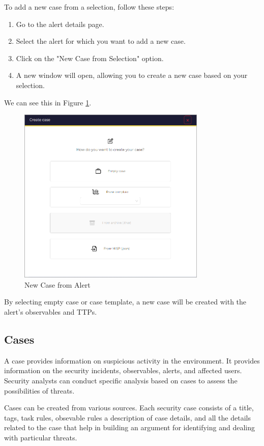 \documentclass{article}
\begin{document}
To add a new case from a selection, follow these steps:

\begin{enumerate}
  \item Go to the alert details page.
  \item Select the alert for which you want to add a new case.
  \item Click on the "New Case from Selection" option.
  \item A new window will open, allowing you to create a new case based on your selection.
\end{enumerate}

We can see this in Figure \ref{fig:newcase}.
\begin{figure}[H]
    \centering
    \includegraphics[width=0.8\textwidth]{alerts2.png}
    \caption{New Case from Alert}
    \label{fig:newcase}
\end{figure}

By selecting empty case  or case template, a new case will be created with the alert's observables and TTPs.\\



\subsection{Cases}

\begin{compactitem}
    \item A case provides information on suspicious activity in the environment. It provides information on the security incidents, observables, alerts, and affected users. Security analysts can conduct specific analysis based on cases to assess the possibilities of threats.
    \item Cases can be created from various sources. Each security case consists of a title, tags, task rules, obsevable rules a description of case details, and all the details related to the case that help in building an argument for identifying and dealing with particular threats.
\end{compactitem}
\end{document}
